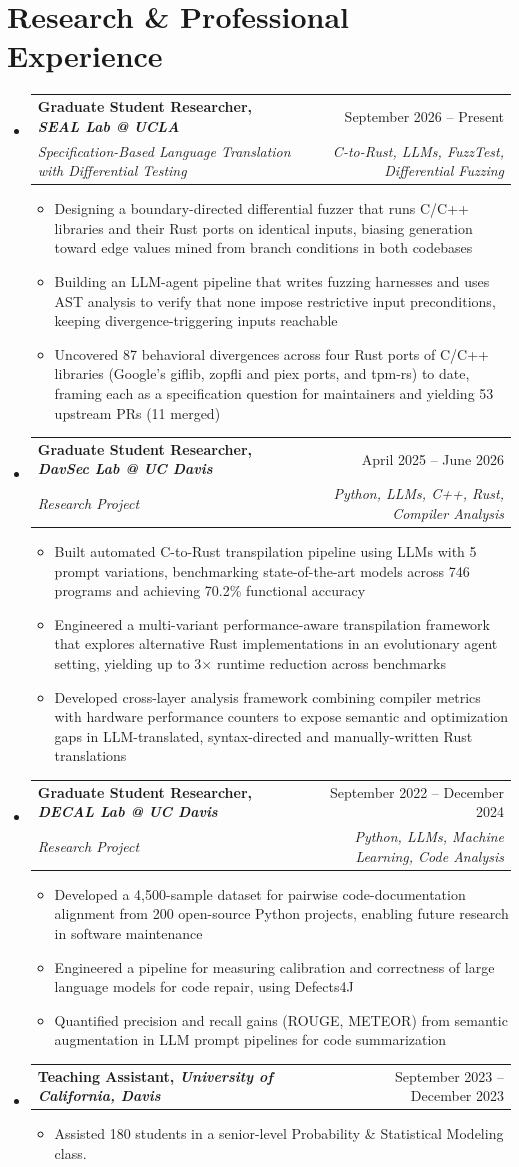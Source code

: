 \documentclass[letterpaper,10pt]{article}
\makeatletter
\newcommand{\resumeItem}[1]{\item\small{#1} \vspace{-3pt}}
\newcommand{\resumeSubheading}[4]{%
  \vspace{-1pt}\item
  \begin{tabular*}{0.97\textwidth}[t]{l@{\extracolsep{\fill}}r}
    \textbf{#1} & #2 \\
    \textit{#3} & \textit{#4} \\
  \end{tabular*}\vspace{-7pt}}
\newcommand{\resumeSubheadingSmall}[2]{%
  \vspace{-1pt}\item
  \begin{tabular*}{0.97\textwidth}[t]{l@{\extracolsep{\fill}}r}
    \textbf{#1} & #2 \\
  \end{tabular*}\vspace{-7pt}}
\newcommand{\resumeSubHeadingList}{\begin{itemize}[leftmargin=0.15in, label={}, labelsep=0.15in]}
\newcommand{\resumeJustifiedList}{\begin{itemize}[leftmargin=0.3in, label=\textbullet, labelsep=0.1in]}
\newcommand{\resumeSubHeadingListEnd}{\end{itemize}}
\makeatother
\begin{document}
\section{Research \& Professional Experience}
{\normalsize
\resumeSubHeadingList
  \resumeSubheading{Graduate Student Researcher, \textit{SEAL Lab @ UCLA}}{September 2026 -- Present}{Specification-Based Language Translation with Differential Testing}{C-to-Rust, LLMs, FuzzTest, Differential Fuzzing}
  \resumeJustifiedList
    \resumeItem{Designing a boundary-directed differential fuzzer that runs C/C++ libraries and their Rust ports on identical inputs, biasing generation toward edge values mined from branch conditions in both codebases}
    \resumeItem{Building an LLM-agent pipeline that writes fuzzing harnesses and uses AST analysis to verify that none impose restrictive input preconditions, keeping divergence-triggering inputs reachable}
    \resumeItem{Uncovered 87 behavioral divergences across four Rust ports of C/C++ libraries (Google's giflib, zopfli and piex ports, and tpm-rs) to date, framing each as a specification question for maintainers and yielding 53 upstream PRs (11 merged)}
  \end{itemize}
  \resumeSubheading{Graduate Student Researcher, \textit{DavSec Lab @ UC Davis}}{April 2025 -- June 2026}{Research Project}{Python, LLMs, C++, Rust, Compiler Analysis}
  \resumeJustifiedList
    \resumeItem{Built automated C-to-Rust transpilation pipeline using LLMs with 5 prompt variations, benchmarking state-of-the-art models across 746 programs and achieving 70.2\% functional accuracy}
    \resumeItem{Engineered a multi-variant performance-aware transpilation framework that explores alternative Rust implementations in an evolutionary agent setting, yielding up to 3$\times$ runtime reduction across benchmarks}
    \resumeItem{Developed cross-layer analysis framework combining compiler metrics with hardware performance counters to expose semantic and optimization gaps in LLM-translated, syntax-directed and manually-written Rust translations}
  \end{itemize}
  \resumeSubheading{Graduate Student Researcher, \textit{DECAL Lab @ UC Davis}}{September 2022 -- December 2024}{Research Project}{Python, LLMs, Machine Learning, Code Analysis}
  \resumeJustifiedList
    \resumeItem{Developed a 4,500-sample dataset for pairwise code-documentation alignment from 200 open-source Python projects, enabling future research in software maintenance}
    \resumeItem{Engineered a pipeline for measuring calibration and correctness of large language models for code repair, using Defects4J}
    \resumeItem{Quantified precision and recall gains (ROUGE, METEOR) from semantic augmentation in LLM prompt pipelines for code summarization}
  \end{itemize}
  \resumeSubheadingSmall{Teaching Assistant, \textit{University of California, Davis}}{September 2023 -- December 2023}
  \resumeJustifiedList
    \resumeItem{Assisted 180 students in a senior-level Probability \& Statistical Modeling class.}
  \end{itemize}
\resumeSubHeadingListEnd
}
\end{document}
